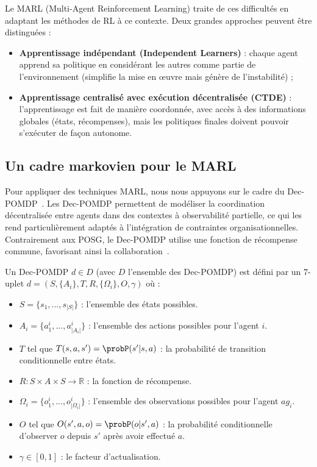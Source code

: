 Le \ac{MARL} (Multi-Agent Reinforcement Learning) traite de ces difficultés en adaptant les méthodes de \ac{RL} à ce contexte. Deux grandes approches peuvent être distinguées :
\begin{itemize}
    \item \textbf{Apprentissage indépendant (Independent Learners)} : chaque agent apprend sa politique en considérant les autres comme partie de l'environnement (simplifie la mise en œuvre mais génère de l'instabilité) ;
    \item \textbf{Apprentissage centralisé avec exécution décentralisée (\ac{CTDE})} : l'apprentissage est fait de manière coordonnée, avec accès à des informations globales (états, récompenses), mais les politiques finales doivent pouvoir s'exécuter de façon autonome.
\end{itemize}

\subsection{Un cadre markovien pour le MARL}

Pour appliquer des techniques \ac{MARL}, nous nous appuyons sur le cadre du \ac{Dec-POMDP}~\cite{Oliehoek2016}. Les \ac{Dec-POMDP} permettent de modéliser la coordination décentralisée entre agents dans des contextes à observabilité partielle, ce qui les rend particulièrement adaptés à l'intégration de contraintes organisationnelles. Contrairement aux \ac{POSG}, le \ac{Dec-POMDP} utilise une fonction de récompense commune, favorisant ainsi la collaboration~\cite{Beynier2013}.

Un \ac{Dec-POMDP} $d \in D$ (avec $D$ l'ensemble des \ac{Dec-POMDP}) est défini par un 7-uplet $d = (S,\{A_i\},T,R,\{\Omega_i\},O,\gamma)$ où :
\begin{itemize}
    \item $S = \{s_1, ..., s_{|S|}\}$ : l'ensemble des états possibles.
    \item $A_i = \{a_1^i, ..., a_{|A_i|}^i\}$ : l'ensemble des actions possibles pour l'agent $i$.
    \item $T$ tel que $T(s,a,s') = \probP(s'|s,a)$ : la probabilité de transition conditionnelle entre états.
    \item $R: S \times A \times S \rightarrow \mathbb{R}$ : la fonction de récompense.
    \item $\Omega_i = \{o_1^i, ..., o_{|\Omega_i|}^i\}$ : l'ensemble des observations possibles pour l'agent $ag_i$.
    \item $O$ tel que $O(s',a,o) = \probP(o|s',a)$ : la probabilité conditionnelle d'observer $o$ depuis $s'$ après avoir effectué $a$.
    \item $\gamma \in [0,1]$ : le facteur d'actualisation.
\end{itemize}

